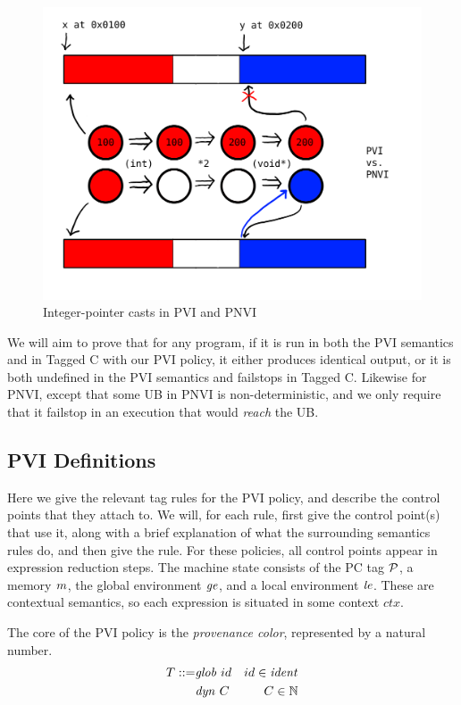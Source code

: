 \documentclass[acmsmall,review,anonymous]{acmart}\settopmatter{printfolios=true,printccs=false,printacmref=false}
\begin{document}
\begin{figure}
  \includegraphics[width=.6\textwidth]{PVIvsPNVI.png}
  \caption{Integer-pointer casts in PVI and PNVI}
  \label{fig:PVI-PNVI}
\end{figure}

We will aim to prove that for any program, if it is run in both the PVI semantics
and in Tagged C with our PVI policy, it either produces identical output, or it is both
undefined in the PVI semantics and failstops in Tagged C. Likewise for PNVI, except that
some UB in PNVI is non-deterministic, and we only require that it failstop in an execution
that would {\it reach} the UB.

\subsection{PVI Definitions}

Here we give the relevant tag rules for the PVI policy, and describe the control points that
they attach to. We will, for each rule, first give the control point(s) that use it, along
with a brief explanation of what the surrounding semantics rules do, and then give the rule.
For these policies, all control points appear in expression reduction steps.
The machine state consists of the PC tag \(\mathcal{P}\), a memory \(m\),
the global environment \(\mathit{ge}\), and a local environment \(\mathit{le}\). These are contextual semantics,
so each expression is situated in some context \(\mathit{ctx}\).

The core of the PVI policy is the {\it provenance color}, represented
by a natural number.
%
\begin{align*}
  T ::= & \mathit{glob} ~ id & id \in \mathit{ident} \\
  & \mathit{dyn} ~ C & C \in \mathbb{N} \\
\end{align*}
\end{document}
